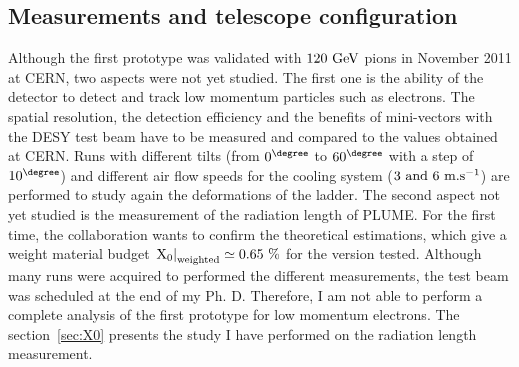 

    \subsection{Measurements and telescope configuration}

    Although the first prototype was validated with $120~\rm{GeV}$ pions in November 2011 at CERN, two aspects were not yet studied.
    The first one is the ability of the detector to detect and track low momentum particles such as electrons.
    The spatial resolution, the detection efficiency and the benefits of mini-vectors with the DESY test beam have to be measured and compared to the values obtained at CERN.
    Runs with different tilts (from $0^{\degree}$ to $60^{\degree}$ with a step of $10^{\degree}$) and different air flow speeds for the cooling system ($3~\rm{and}~6~\rm{m.s}^{-1}$) are performed to study again the deformations of the ladder.
    The second aspect not yet studied is the measurement of the radiation length of \gls{PLUME}.
    For the first time, the collaboration wants to confirm the theoretical estimations, which give a weight material budget $\left. \rm{X_{0}}\right|_{\rm{weighted}} \simeq 0.65~\%$ for the version tested.
    Although many runs were acquired to performed the different measurements, the test beam was scheduled at the end of my Ph. D.
    Therefore, I am not able to perform a complete analysis of the first prototype for low momentum electrons.
    The section~\ref{sec:X0} presents the study I have performed on the radiation length measurement.

